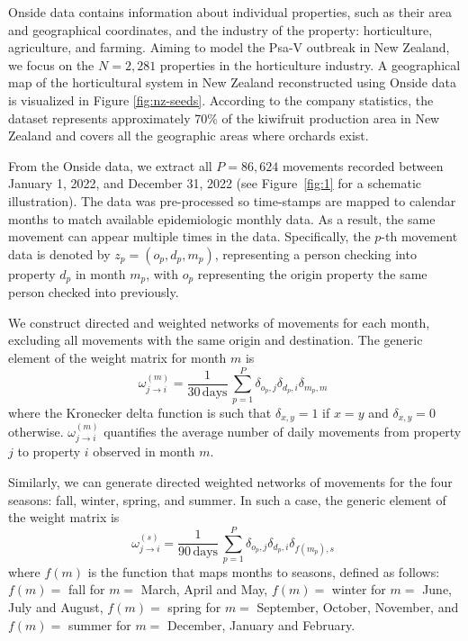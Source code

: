 \documentclass[aps,physrev,reprint,superscriptaddress]{revtex4-1}
\begin{document}
Onside data contains information about individual properties, such as their area and geographical coordinates, and the industry of the property: horticulture, agriculture, and farming. Aiming to model the Psa-V outbreak in New Zealand, we focus on the $N = 2,281$ properties in the horticulture industry. A geographical map of the horticultural system in New Zealand reconstructed using Onside data is visualized in Figure \ref{fig:nz-seeds}. According to the company statistics, the dataset represents approximately 70\% of the kiwifruit production area in New Zealand and covers all the geographic areas where orchards exist.   

  From the Onside data, we extract all $P = 86,624$ movements recorded between January 1, 2022, and December 31, 2022 (see Figure~\ref{fig:1} for a schematic illustration). The data was pre-processed so time-stamps are mapped to calendar months to match available epidemiologic monthly data. As a result, the same movement can appear multiple times in the data. Specifically, the $p$-th movement data is denoted by $z_p = (o_p,d_p,m_p)$, representing a person checking into property $d_p$ in month $m_p$, with $o_p$ representing the origin property the same person checked into previously. 

We construct directed and weighted networks of movements for each month, excluding all movements with the same origin and destination. The generic element of the weight matrix for month $m$ is
\begin{equation}
\omega^{(m)}_{j \to i} = \frac{1}{30 \, \textrm{days} } \, \sum_{p = 1}^P  \delta_{o_p,j} \delta_{d_p,i}  \delta_{m_p, m} \; 
    \label{eq:weight_month}
\end{equation}
where the Kronecker delta function is such that $\delta_{x,y} = 1$ if $x = y$ and $\delta_{x,y} = 0$ otherwise. $\omega^{(m)}_{j \to i}$ quantifies the average number of daily movements 
from property $j$ to property $i$
observed in month $m$.

Similarly, we can generate directed weighted networks of movements for the four seasons: fall, winter, spring, and summer. In such a case, the generic element of the weight matrix is
\begin{equation}
\omega^{(s)}_{j \to i} = \frac{1}{90 \, \textrm{days} } \, \sum_{p = 1}^P  \delta_{o_p,j} \delta_{d_p,i} \delta_{f(m_p), s} \; 
    \label{eq:weight_season}
\end{equation}
where $f(m)$ is the function that maps months to seasons, defined as follows: $f(m) = $ fall for $m = $ March, April and May,  $f(m) = $ winter for $m = $ June, July and August,  $f(m) = $ spring for $m = $ September, October, November, and $f(m) = $ summer for $m = $  December, January and February.  
\end{document}
